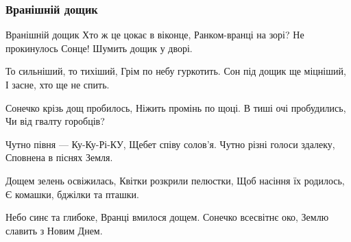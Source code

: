  
 
 

\subsubsection{Вранішній дощик}
\label{sec:poetry.rus.sokor.vranishnii_doschyk}

Вранішній дощик
Хто ж це цокає в віконце,
Ранком-вранці на зорі?
Не прокинулось Сонце!
Шумить дощик у дворі.

То сильніший, то тихіший,
Грім по небу гуркотить.
Сон під дощик ще міцніший,
І засне, хто ще не спить.

Сонечко крізь дощ пробилось,
Ніжить промінь по щоці.
В тиші очі пробудились,
Чи від гвалту горобців?

Чутно півня --- Ку-Ку-Рі-КУ,
Щебет співу солов’я.
Чутно різні голоси здалеку,
Сповнена в піснях Земля.

Дощем зелень освіжилась,
Квітки розкрили пелюстки,
Щоб насіння їх родилось,
Є комашки, бджілки та пташки.

Небо синє та глибоке,
Вранці вмилося дощем.
Сонечко всесвітнє око,
Землю славить з Новим Днем.
